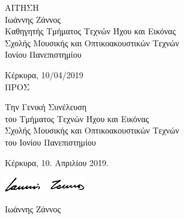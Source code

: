 \documentclass[a4, 11pt]{article}
\begin{document}
\begin{multicols}{2}
\noindent
\vspace{0.5cm}
ΑΙΤΗΣΗ\\
\noindent
Ιωάννης Ζάννος\\
Καθηγητής Τμήματος Τεχνών Ήχου και Εικόνας\\
Σχολής Μουσικής και Οπτικοακουστικών Τεχνών\\
Ιονίου Πανεπιστημίου

\vspace*{0.5cm}
\noindent
Κέρκυρα, 10/04/2019\\


\columnbreak
\noindent
ΠΡΟΣ

\vspace{0.5cm}
\noindent
Την Γενική Συνέλευση\\
του Τμήματος Τεχνών Ήχου και Εικόνας\\
Σχολής Μουσικής και Οπτικοακουστικών Τεχνών\\
του Ιονίου Πανεπιστημίου

\vspace{1cm}



\vspace{1cm}
\parindent=0.5cm
Κέρκυρα,  10. Απριλίου 2019.

\vspace{0.5cm}

\includegraphics[width=3.5cm]{signature}

\vspace{0.5cm}
\parindent=1cm
Ιωάννης Ζάννος

\end{multicols}
\end{document}
